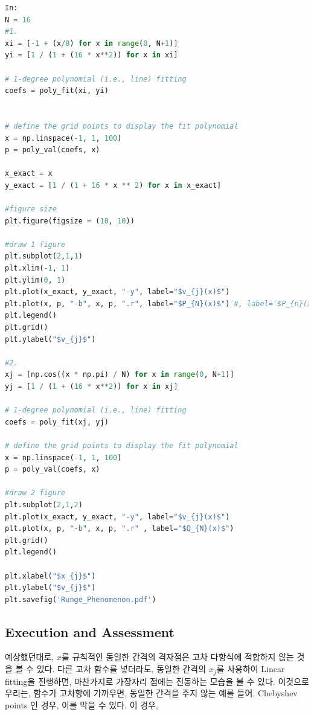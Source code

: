 \documentclass[11pt]{article}
\begin{document}
\begin{lstlisting}[language=Python]
In:
N = 16
#1.
xi = [-1 + (x/8) for x in range(0, N+1)]
yi = [1 / (1 + (16 * x**2)) for x in xi]

# 1-degree polynomial (i.e., line) fitting
coefs = poly_fit(xi, yi)


# define the grid points to display the fit polynomial
x = np.linspace(-1, 1, 100)
p = poly_val(coefs, x)

x_exact = x
y_exact = [1 / (1 + 16 * x ** 2) for x in x_exact]

#figure size
plt.figure(figsize = (10, 10))

#draw 1 figure
plt.subplot(2,1,1)
plt.xlim(-1, 1)
plt.ylim(0, 1)
plt.plot(x_exact, y_exact, "-y", label="$v_{j}(x)$")
plt.plot(x, p, "-b", x, p, ".r", label="$P_{N}(x)$") #, label='$P_{n}(x) dot$')
plt.legend()
plt.grid()
plt.ylabel("$v_{j}$")

#2.
xj = [np.cos((x * np.pi) / N) for x in range(0, N+1)]
yj = [1 / (1 + (16 * x**2)) for x in xj]

# 1-degree polynomial (i.e., line) fitting
coefs = poly_fit(xj, yj)

# define the grid points to display the fit polynomial
x = np.linspace(-1, 1, 100)
p = poly_val(coefs, x)

#draw 2 figure
plt.subplot(2,1,2)
plt.plot(x_exact, y_exact, "-y", label="$v_{j}(x)$")
plt.plot(x, p, "-b", x, p, ".r" , label="$Q_{N}(x)$")
plt.grid()
plt.legend()

plt.xlabel("$x_{j}$")
plt.ylabel("$v_{j}$")
plt.savefig('Runge_Phenomenon.pdf')
\end{lstlisting}

\subsection{Execution and Assessment}
예상했던대로, $x$를 규칙적인 동일한 간격의 격자점은 고차 다항식에 적합하지 않는 것을 볼 수 있다. 다른 고차 함수를 넣더라도, 동일한 간격의 $x_j$를 사용하여 Linear fitting을 진행하면, 마찬가지로 가장자리 점에는 진동하는 모습을 볼 수 있다. 이것으로 우리는, 함수가 고차항에 가까우면, 동일한 간격을 주지 않는 예를 들어, Chebyshev points 인 경우, 이를 막을 수 있다.  이 경우,
\end{document}
